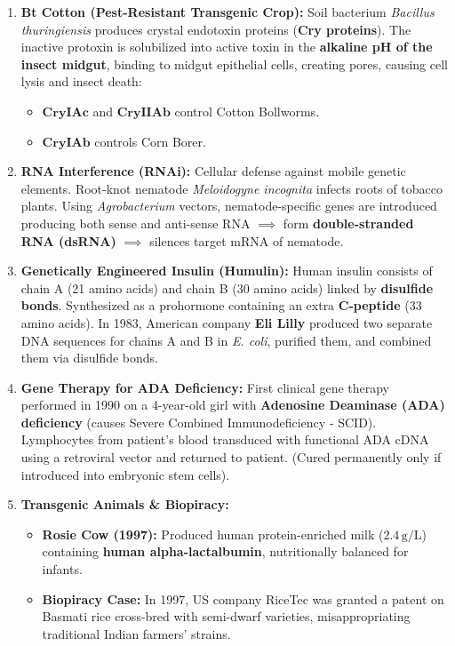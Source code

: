 \documentclass[10pt,twoside,openright]{book}
\begin{document}
\begin{ncertbox}
\begin{enumerate}[leftmargin=*]
  \item \textbf{Bt Cotton (Pest-Resistant Transgenic Crop):}
  Soil bacterium \textit{Bacillus thuringiensis} produces crystal endotoxin proteins (\textbf{Cry proteins}). The inactive protoxin is solubilized into active toxin in the \textbf{alkaline pH of the insect midgut}, binding to midgut epithelial cells, creating pores, causing cell lysis and insect death:
  \begin{itemize}
    \item $\mathbf{CryIAc}$ and $\mathbf{CryIIAb}$ control Cotton Bollworms.
    \item $\mathbf{CryIAb}$ controls Corn Borer.
  \end{itemize}
  \item \textbf{RNA Interference (RNAi):}
  Cellular defense against mobile genetic elements. Root-knot nematode \textit{Meloidogyne incognita} infects roots of tobacco plants. Using \textit{Agrobacterium} vectors, nematode-specific genes are introduced producing both sense and anti-sense RNA $\implies$ form \textbf{double-stranded RNA (dsRNA)} $\implies$ silences target mRNA of nematode.
  \item \textbf{Genetically Engineered Insulin (Humulin):}
  Human insulin consists of chain A (21 amino acids) and chain B (30 amino acids) linked by \textbf{disulfide bonds}. Synthesized as a prohormone containing an extra \textbf{C-peptide} (33 amino acids). In 1983, American company \textbf{Eli Lilly} produced two separate DNA sequences for chains A and B in \textit{E. coli}, purified them, and combined them via disulfide bonds.
  \item \textbf{Gene Therapy for ADA Deficiency:}
  First clinical gene therapy performed in 1990 on a 4-year-old girl with \textbf{Adenosine Deaminase (ADA) deficiency} (causes Severe Combined Immunodeficiency - SCID). Lymphocytes from patient's blood transduced with functional ADA cDNA using a retroviral vector and returned to patient. (Cured permanently only if introduced into embryonic stem cells).
  \item \textbf{Transgenic Animals \& Biopiracy:}
  \begin{itemize}
    \item \textbf{Rosie Cow (1997):} Produced human protein-enriched milk ($2.4\,\mathrm{g/L}$) containing \textbf{human alpha-lactalbumin}, nutritionally balanced for infants.
    \item \textbf{Biopiracy Case:} In 1997, US company RiceTec was granted a patent on Basmati rice cross-bred with semi-dwarf varieties, misappropriating traditional Indian farmers' strains.
  \end{itemize}
\end{enumerate}
\end{ncertbox}
\end{document}
